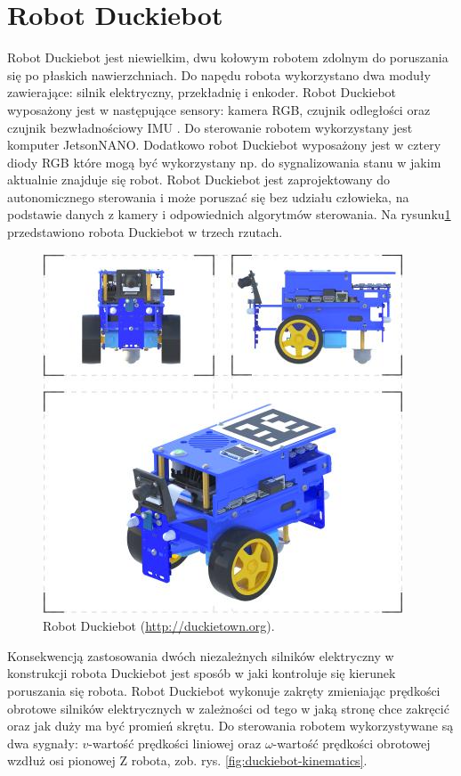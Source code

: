 \documentclass[conference]{IEEEtran}
\begin{document}

\section{Robot Duckiebot}\label{sec:robot-duckiebot}
Robot Duckiebot jest niewielkim, dwu kołowym robotem zdolnym do poruszania się po płaskich nawierzchniach. Do napędu robota wykorzystano dwa moduły zawierające: silnik elektryczny, przekładnię i enkoder. Robot Duckiebot wyposażony jest w następujące sensory: kamera RGB, czujnik odległości oraz czujnik bezwładnościowy IMU \cite{gupta2022low}. Do sterowanie robotem wykorzystany jest komputer JetsonNANO. Dodatkowo robot Duckiebot wyposażony jest w cztery diody RGB które mogą być wykorzystany np. do sygnalizowania stanu w jakim aktualnie znajduje się robot. Robot Duckiebot jest zaprojektowany do autonomicznego sterowania i może poruszać się bez udziału człowieka, na podstawie danych z kamery i odpowiednich algorytmów sterowania. Na rysunku\;\ref{fig:duckiebot-3d} przedstawiono robota Duckiebot w trzech rzutach.

\begin{figure}[h]
    \centering
    \includegraphics[width=.9\columnwidth]{duckiebot-blue-3d}
    \caption{Robot Duckiebot (\url{http://duckietown.org}).}
    \label{fig:duckiebot-3d}
\end{figure}

Konsekwencją zastosowania dwóch niezależnych silników elektryczny w konstrukcji robota Duckiebot jest sposób w jaki kontroluje się kierunek poruszania się robota.
Robot Duckiebot wykonuje zakręty zmieniając prędkości obrotowe silników elektrycznych w zależności od tego w jaką stronę chce zakręcić oraz jak duży ma być promień skrętu.
Do sterowania robotem wykorzystywane są dwa sygnały: $v$-wartość prędkości liniowej oraz $\omega$-wartość prędkości obrotowej wzdłuż osi pionowej Z robota, zob. rys. \ref{fig:duckiebot-kinematics}.
\end{document}
